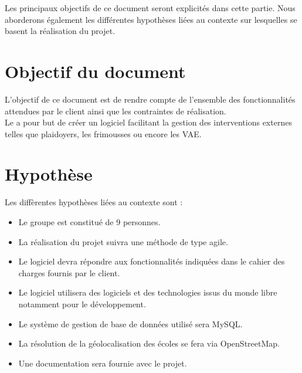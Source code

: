 	Les principaux objectifs de ce document seront explicités dans cette partie. Nous aborderons également les différentes hypothèses liées au contexte sur lesquelles se basent la réalisation du projet.


\section{Objectif du document}
	L'objectif de ce document est de rendre compte de l'ensemble des fonctionnalités attendues par le client ainsi que les contraintes de réalisation. \\
	
	Le \PICCourt \nomClient{} a pour but de créer un logiciel facilitant la gestion des interventions externes telles que plaidoyers, les frimousses ou encore les VAE.
	
	
\section{Hypothèse}
	Les diffèrentes hypothèses liées au contexte sont :
	\begin{itemize}
		\item Le groupe \nomEquipe{} est constitué de 9 personnes.
		\item La réalisation du projet suivra une méthode de type agile.
		\item Le logiciel devra répondre aux fonctionnalités indiquées dans le cahier des charges fournis par le client.
		\item Le logiciel utilisera des logiciels et des technologies issus du monde libre notamment pour le développement.
		\item Le système de gestion de base de données utilisé sera MySQL.
		\item La résolution de la géolocalisation des écoles se fera via OpenStreetMap.
		\item Une documentation sera fournie avec le projet.
	\end{itemize}
	